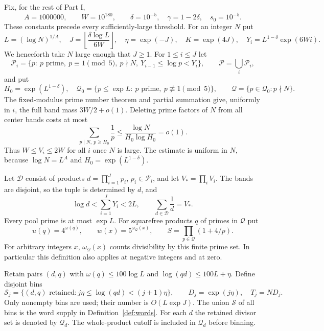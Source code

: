 \documentclass[11pt]{article}
\theoremstyle{definition}
\begin{document}
Fix, for the rest of Part I,
\begin{equation}\label{eq:fixedparameters}
 A=1000000,\qquad W=10^{180},\qquad
 \delta=10^{-5},\quad\gamma=1-2\delta,\quad s_0=10^{-5}.
\end{equation}
These constants precede every sufficiently-large threshold.
For an integer $N$ put
\begin{equation}\label{eq:variableparameters}
 L=(\log N)^{1/A},\quad
 J=\left\lfloor\frac{\delta\log L}{6W}\right\rfloor,
 \quad\eta=\exp(-J),\quad K=\exp(4J),\quad
 Y_i=L^{1-\delta}\exp(6Wi).
\end{equation}
We henceforth take $N$ large enough that $J\ge1$.
For $1\le i\le J$ let
\[
 \mathcal P_i=\{p:\ p\text{ prime},\ p\equiv1\pmod5,
             \ p\nmid N,\ Y_{i-1}\le\log p<Y_i\},
 \qquad\mathcal P=\bigcup_i\mathcal P_i,
\]
and put
\[
 H_0=\exp(L^{1-\delta}),\quad
 \mathcal Q_0=\{p\le\exp L:\ p\text{ prime},\ p\not\equiv1\pmod5\},
 \qquad\mathcal Q=\{p\in\mathcal Q_0:p\nmid N\}.
\]
The fixed-modulus prime number theorem and partial summation give,
uniformly in $i$, the full band mass $3W/2+o(1)$.
Deleting prime factors of $N$ from all center bands costs at most
\begin{equation}\label{eq:centerholes}
 \sum_{p\mid N,\ p\ge H_0}\frac1p
 \le\frac{\log N}{H_0\log H_0}=o(1).
\end{equation}
Thus $W\le V_i\le2W$ for all $i$ once $N$ is large.
The estimate is uniform in $N$, because $\log N=L^A$ and
$H_0=\exp(L^{1-\delta})$.

Let $\mathcal D$ consist of products $d=\prod_{i=1}^J p_i$,
$p_i\in\mathcal P_i$, and let $V_*=\prod_iV_i$.
The bands are disjoint, so the tuple is determined by $d$, and
\begin{equation}\label{eq:tuplegeometry}
 \log d<\sum_{i=1}^J Y_i<2L,\qquad
 \sum_{d\in\mathcal D}\frac1d=V_*.
\end{equation}
Every pool prime is at most $\exp L$.
For squarefree products $q$ of primes in $\mathcal Q$ put
\[
 u(q)=4^{\omega(q)},\qquad
 w(x)=5^{\omega_{\mathcal Q}(x)},\qquad
 S=\prod_{p\in\mathcal Q}(1+4/p).
\]
For arbitrary integers $x$, $\omega_{\mathcal Q}(x)$ counts divisibility
by this finite prime set. In particular this definition also applies
at negative integers and at zero.

Retain pairs $(d,q)$ with $\omega(q)\le100\log L$ and
$\log(qd)\le100L+\eta$. Define disjoint bins
\begin{equation}\label{eq:bins}
 \mathcal S_j=\{(d,q)\text{ retained}:j\eta\le\log(qd)<(j+1)\eta\},
 \qquad D_j=\exp(j\eta),\quad T_j=ND_j.
\end{equation}
Only nonempty bins are used; their number is $O(L\exp J)$.
The union $\mathcal S$ of all bins is the word supply in
Definition~\ref{def:words}.
For each $d$ the retained divisor set is denoted by $\mathcal Q_d$.
The whole-product cutoff is included in $\mathcal Q_d$ before binning.
\end{document}
